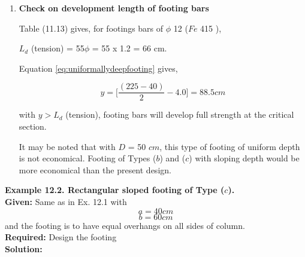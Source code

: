 \documentclass{report}
\newcommand{\equmacro}[1] {Equation #1}
\newcommand{\tablemacro}[1] {Table #1}
\newcommand{\Fefouronefivemacro}[1] {$Fe$ 415 #1}
\begin{document}
\begin{enumerate}
Table 19 of the Code gives,
$$\sage{tau_c}=0.32N/mm^2$$
With
$$k = 1.0 $$
\equmacro \ref{eq:concretesolidslabs} gives, 
        $$\sage{tau_a}=\sage{tau_c}=0.032kN/cm^2$$
With        
$$\sage{tau_v}=\sage{tau_a}, D = 50 cm \text{ is safe}$$

\item  \textbf{Check on development length of footing bars}

\tablemacro (11.13) gives, for footings bars of $\phi$ 12 (\Fefouronefivemacro),

$L_d$ (tension) = 55$\phi$ = 55 x 1.2 = 66 cm.

\equmacro \ref{eq:uniformallydeepfooting} gives, 

$$y=\bigg[\frac{(225-40)}{2}-4.0\bigg]=88.5cm$$

with $y > L_d$ (tension), footing bars will develop full strength at the critical section.

It may be noted that with $D$ = 50 $cm$, this type of footing of uniform depth is not economical. 
Footing of Types ($b$) and ($c$) with sloping depth would be more economical than the present design.
\end{enumerate} %
\textbf{ Example 12.2. Rectangular sloped footing of Type ($c$).}\\
\textbf{Given:}
Same as in Ex. 12.1 with
$$a = 40 cm$$
$$b = 60 cm$$ 
and the footing is to have equal overhangs on all sides of column.\\
\textbf{Required:} Design the footing\\
\textbf{Solution:}
\end{document}
